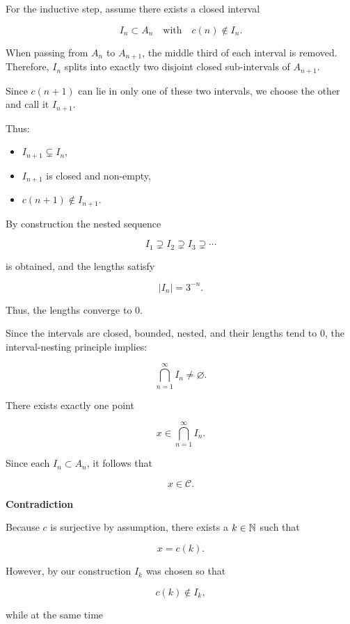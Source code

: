 For the inductive step, assume there exists a closed interval

\[
	I_{n} \subset A_{n} \quad \text{with} \quad c(n) \notin I_{n}.
\]

When passing from \(A_{n}\) to \(A_{n+1}\), the middle third of each interval is removed.
Therefore, \(I_{n}\) splits into exactly two disjoint closed sub-intervals of \(A_{n+1}\).

Since \(c(n+1)\) can lie in only one of these two intervals, we choose the other and call it \(I_{n+1}\).

Thus:

\begin{itemize}

	\item \(I_{n+1} \subsetneq I_{n}\),

	\item \(I_{n+1}\) is closed and non-empty,

	\item \(c(n+1) \notin I_{n+1}\).

\end{itemize}


By construction the nested sequence

\[
	I_{1} \supsetneq I_{2} \supsetneq I_{3} \supsetneq \cdots
\]

is obtained, and the lengths satisfy

\[
	|I_{n}| = 3^{-n}.
\]

Thus, the lengths converge to \(0\).


Since the intervals are closed, bounded, nested, and their lengths tend to \(0\), the interval-nesting principle implies:

\[
	\bigcap_{n=1}^{\infty} I_{n} \neq \varnothing.
\]

There exists exactly one point

\[
	x \in \bigcap_{n=1}^{\infty} I_{n}.
\]

Since each \(I_{n} \subset A_{n}\), it follows that

\[
	x \in \mathcal{C}.
\]

\textbf{Contradiction}

Because \(c\) is surjective by assumption, there exists a \(k \in \mathbb{N}\) such that

\[
	x = c(k).
\]

However, by our construction \(I_{k}\) was chosen so that

\[
	c(k) \notin I_{k},
\]

while at the same time


